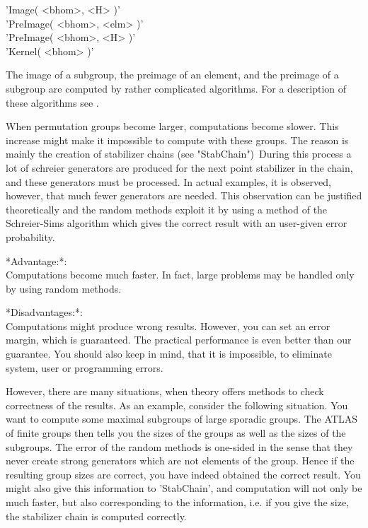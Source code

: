 \vspace{5mm}
'Image( <bhom>, <H> )' \\
'PreImage( <bhom>, <elm> )'%
 \\
'PreImage( <bhom>, <H> )' \\
'Kernel( <bhom> )'%

The image of a subgroup, the  preimage of an element, and the preimage of
a  subgroup  are  computed  by  rather  complicated  algorithms.   For  a
description of these algorithms see \cite{But85a}.


When permutation groups become larger, computations become slower. This
increase might make it impossible to compute with these groups. The reason
is mainly the creation of stabilizer chains (see "StabChain")\:\ During
this process a lot of schreier generators are produced for the next point
stabilizer in the chain, and these generators must be processed. In actual
examples, it is observed, however, that much fewer generators are needed.
This observation can be justified theoretically and the random methods
exploit it by using a method of the Schreier-Sims algorithm which gives the
correct result with an user-given error probability. 

*Advantage:*:\\
  Computations become much faster. In fact, large problems may be handled
  only by using random methods.

*Disadvantages:*:\\
  Computations might produce wrong results. However, you can set an error
  margin, which is guaranteed. The practical performance is even better than
  our guarantee. You should also keep in mind, that it is
  impossible, to eliminate system, user or programming errors.

However, there are many situations, when theory offers methods to check
correctness of the results. As an example, consider the following situation.
You want to compute some maximal subgroups of large sporadic groups. The
ATLAS of finite groups then tells you the sizes of the groups as well as the
sizes of the subgroups. The error of the random methods is one-sided in the
sense that they never create strong generators which are not elements of the
group. Hence if the resulting group
sizes are correct, you have indeed obtained the correct result.
You might also give this information to 'StabChain', and computation will
not only be much faster, but also corresponding to the information, i.e. if
you give the size, the stabilizer chain is computed correctly.

